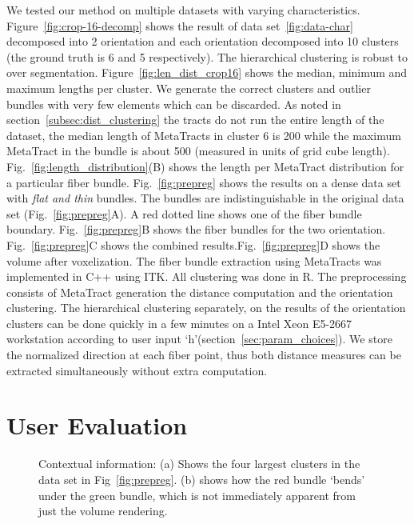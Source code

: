 We tested our method on multiple datasets with varying characteristics. 
Figure~\ref{fig:crop-16-decomp} shows the result of data set~\ref{fig:data-char} decomposed into 2 orientation and each orientation decomposed into 10 clusters (the ground truth is 6 and 5 respectively). The hierarchical clustering is robust to over segmentation.
Figure~\ref{fig:len_dist_crop16} shows the median, minimum and maximum lengths per cluster. We generate the correct clusters and outlier bundles with very few elements which can be discarded. As noted in section~\ref{subsec:dist_clustering} the tracts do not run the entire length of the dataset, the median length of MetaTracts in cluster 6 is 200 while the maximum MetaTract in the bundle is about 500 (measured in units of grid cube length). Fig.~\ref{fig:length_distribution}(B) shows the length per MetaTract distribution for a particular fiber bundle. 
Fig.~\ref{fig:prepreg} shows the results on a dense data set with \textit{flat and thin} bundles. The bundles are indistinguishable in the original data set (Fig.~\ref{fig:prepreg}A). A red dotted line shows one of the fiber bundle boundary. Fig.~\ref{fig:prepreg}B shows the fiber bundles for the two orientation. Fig.~\ref{fig:prepreg}C shows the combined results.Fig.~\ref{fig:prepreg}D shows the volume after voxelization.
The fiber bundle extraction using MetaTracts was implemented in C++ using ITK. All clustering was done in R. The preprocessing consists of MetaTract generation the distance computation and the orientation clustering. The hierarchical clustering separately, on the results of the orientation clusters can be done quickly in a few minutes on a Intel Xeon E5-2667 workstation according to user input `h'(section~\ref{sec:param_choices}). We store the normalized direction at each fiber point, thus both distance measures can be extracted simultaneously without extra computation.


\section {User Evaluation}
\label {sec:evaluation}
\begin{figure}[h]
\centering
{}
\caption{Contextual information: (a) Shows the four largest clusters in the data set in Fig~\ref{fig:prepreg}.
(b) shows how the red bundle `bends' under the green bundle, which is not immediately apparent from just the volume rendering.}
\label{fig:context}
\end{figure}


